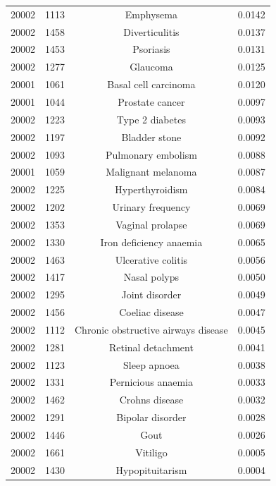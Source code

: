 \begin{longtable}{|c|c|c|c|}
20002 & 1113 & Emphysema & 0.0142\\
20002 & 1458 & Diverticulitis & 0.0137\\
20002 & 1453 & Psoriasis & 0.0131\\
20002 & 1277 & Glaucoma & 0.0125\\
20001 & 1061 & Basal cell carcinoma & 0.0120\\
20001 & 1044 & Prostate cancer & 0.0097\\
20002 & 1223 & Type 2 diabetes & 0.0093\\
20002 & 1197 & Bladder stone & 0.0092\\
20002 & 1093 & Pulmonary embolism & 0.0088\\
20001 & 1059 & Malignant melanoma & 0.0087\\
20002 & 1225 & Hyperthyroidism & 0.0084\\
20002 & 1202 & Urinary frequency & 0.0069\\
20002 & 1353 & Vaginal prolapse & 0.0069\\
20002 & 1330 & Iron deficiency anaemia & 0.0065\\
20002 & 1463 & Ulcerative colitis & 0.0056\\
20002 & 1417 & Nasal polyps & 0.0050\\
20002 & 1295 & Joint disorder & 0.0049\\
20002 & 1456 & Coeliac disease & 0.0047\\
20002 & 1112 & Chronic obstructive airways disease & 0.0045\\
20002 & 1281 & Retinal detachment & 0.0041\\
20002 & 1123 & Sleep apnoea & 0.0038\\
20002 & 1331 & Pernicious anaemia & 0.0033\\
20002 & 1462 & Crohns disease & 0.0032\\
20002 & 1291 & Bipolar disorder & 0.0028\\
20002 & 1446 & Gout & 0.0026\\
20002 & 1661 & Vitiligo & 0.0005\\
20002 & 1430 & Hypopituitarism & 0.0004\\
\end{longtable}

